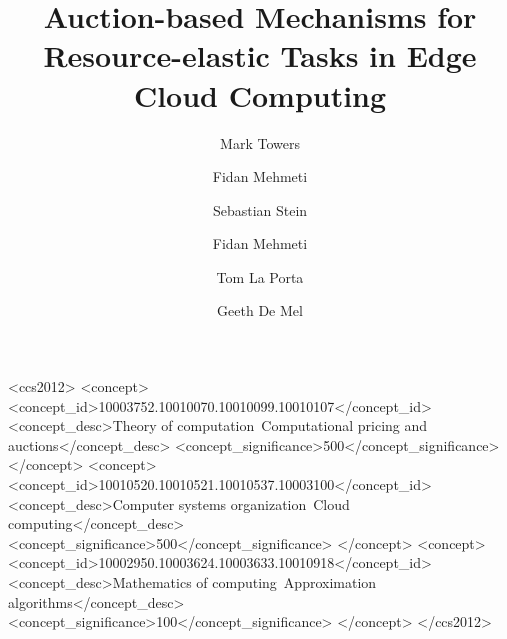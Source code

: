 \documentclass[manuscript,screen]{acmart}
\begin{document}
    \title{Auction-based Mechanisms for Resource-elastic Tasks in Edge Cloud Computing}

    \author{Mark Towers}

    \author{Fidan Mehmeti}
    \author{Sebastian Stein}

    \author{Fidan Mehmeti}
    \author{Tom La Porta}

    \author{Geeth De Mel}

    \renewcommand{\shortauthors}{Towers et al.}

    

\begin{CCSXML}
<ccs2012>
   <concept>
       <concept_id>10003752.10010070.10010099.10010107</concept_id>
       <concept_desc>Theory of computation~Computational pricing and auctions</concept_desc>
       <concept_significance>500</concept_significance>
       </concept>
   <concept>
       <concept_id>10010520.10010521.10010537.10003100</concept_id>
       <concept_desc>Computer systems organization~Cloud computing</concept_desc>
       <concept_significance>500</concept_significance>
       </concept>
   <concept>
       <concept_id>10002950.10003624.10003633.10010918</concept_id>
       <concept_desc>Mathematics of computing~Approximation algorithms</concept_desc>
       <concept_significance>100</concept_significance>
       </concept>
 </ccs2012>
\end{CCSXML}
\end{document}
